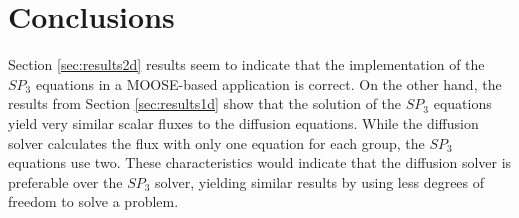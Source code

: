 \documentclass[letterpaper]{article}
\begin{document}
\section{Conclusions}

Section \ref{sec:results2d} results seem to indicate that the implementation of the $SP_3$ equations in a MOOSE-based application is correct.
On the other hand, the results from Section \ref{sec:results1d} show that the solution of the $SP_3$ equations yield very similar scalar fluxes to the diffusion equations.
While the diffusion solver calculates the flux with only one equation for each group, the $SP_3$ equations use two.
These characteristics would indicate that the diffusion solver is preferable over the $SP_3$ solver, yielding similar results by using less degrees of freedom to solve a problem.

\clearpage


\end{document}
